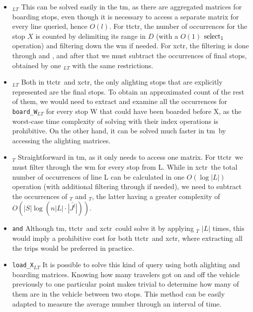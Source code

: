     \begin{itemize}
        \item \texttt{\boardX$_{LT}$} This can be solved easily in the \gls{tm}, as there are aggregated matrices for boarding stops, even though it is necessary to access a separate matrix for every line queried, hence $O(l)$. For \gls{ttctr}, the number of occurrences for the stop $X$ is counted by delimiting its range in $D$ (with a $O(1)$ $\operatorname{select}_1$ operation) and filtering down the \gls{wm} if needed. For \gls{xctr}, the filtering is done through  and , and after that we must subtract the occurrences of final stops, obtained by one \texttt{\endX$_{LT}$} with the same restrictions.
        \item \texttt{\alightX$_{LT}$} Both in \gls{ttctr}~and \gls{xctr}, the only alighting stops that are explicitly represented are the final stops. To obtain an approximated count of the rest of them, we would need to extract and examine all the occurrences for \texttt{board\_W$_{LT}$} for every stop W that could have been boarded before X, as the worst-case time complexity of solving with their index operations is prohibitive. On the other hand, it can be solved much faster in \gls{tm}~by accessing the alighting matrices.
        \item \texttt{\useL$_T$} Straightforward in \gls{tm}, as it only needs to access one matrix. For \gls{ttctr}~we must filter through the \gls{wm} for every stop from L. While in \gls{xctr}~the total number of occurrences of line L can be calculated in one $O(\log|L|)$ operation (with additional filtering through  if needed), we need to subtract the occurrences of \startL$_T$ and \endL$_T$, the latter having a greater complexity of $O(|S|\log(n |L|\cdot \bar{|J^l|}))$.
        \item \texttt{\boardT and\alightT} Although \gls{tm}, \gls{ttctr}~and \gls{xctr}~could solve it by applying \useL$_T$ $|L|$ times, this would imply a prohibitive cost for both \gls{ttctr}~and \gls{xctr}, where extracting all the trips would be preferred in practice.
        \item \texttt{load\_X$_{LT}$} It is possible to solve this kind of query using both alighting and boarding matrices. Knowing how many travelers got on and off the vehicle previously to one particular point makes trivial to determine how many of them are in the vehicle between two stops. This method can be easily adapted to measure the average number through an interval of time.

\end{itemize}
